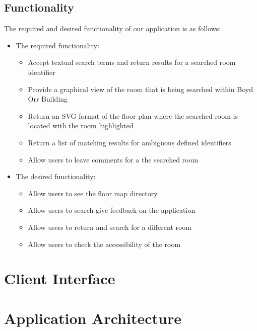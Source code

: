 \documentclass{sig-alt-release2}
\begin{document}
\subsection{Functionality}
The required and desired functionality of our application is as follows:
\begin{itemize}
	\item The required functionality:
	\begin{itemize}
		\item Accept textual search terms and return results for a searched
		room identifier 
		
		\item Provide a graphical view of the room that is being searched
		within Boyd Orr Building
		
		\item Return an SVG format of the floor plan where the searched
		room is located with the room highlighted
		
		\item Return a list of matching results for ambiguous defined
		identifiers
		
		\item Allow users to leave comments for a the searched room		
	\end{itemize}

	\item The desired functionality:
	\begin{itemize}
		\item Allow users to see the floor map directory
		\item Allow users to search give feedback on the application
		\item Allow users to return and search for a different room
		\item Allow users to check the accessibility of the room
	\end{itemize}
\end{itemize}

\section{Client Interface}


\section{Application Architecture}
\end{document}
